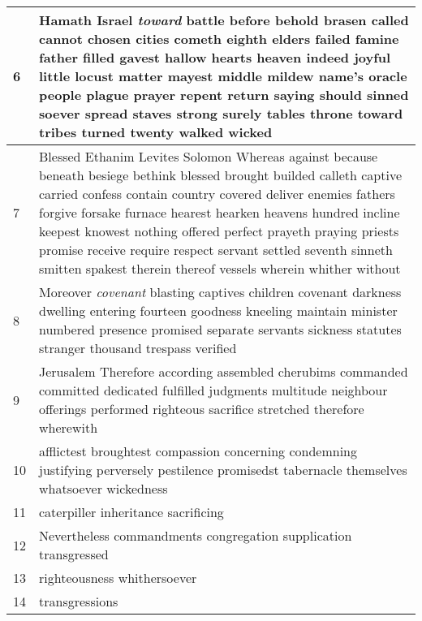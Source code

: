 \begin{center}
\begin{longtable}{p{0.4in}|p{3.6in}}
6 & Hamath Israel \emph{toward} battle before behold brasen called cannot chosen cities cometh eighth elders failed famine father filled gavest hallow hearts heaven indeed joyful little locust matter mayest middle mildew name's oracle people plague prayer repent return saying should sinned soever spread staves strong surely tables throne toward tribes turned twenty walked wicked \\ \hline
7 & Blessed Ethanim Levites Solomon Whereas against because beneath besiege bethink blessed brought builded calleth captive carried confess contain country covered deliver enemies fathers forgive forsake furnace hearest hearken heavens hundred incline keepest knowest nothing offered perfect prayeth praying priests promise receive require respect servant settled seventh sinneth smitten spakest therein thereof vessels wherein whither without \\ \hline
8 & Moreover \emph{covenant} blasting captives children covenant darkness dwelling entering fourteen goodness kneeling maintain minister numbered presence promised separate servants sickness statutes stranger thousand trespass verified \\ \hline
9 & Jerusalem Therefore according assembled cherubims commanded committed dedicated fulfilled judgments multitude neighbour offerings performed righteous sacrifice stretched therefore wherewith \\ \hline
10 & afflictest broughtest compassion concerning condemning justifying perversely pestilence promisedst tabernacle themselves whatsoever wickedness \\ \hline
11 & caterpiller inheritance sacrificing \\ \hline
12 & Nevertheless commandments congregation supplication transgressed \\ \hline
13 & righteousness whithersoever \\ \hline
14 & transgressions \\ \hline



\end{longtable}
\end{center}
 
